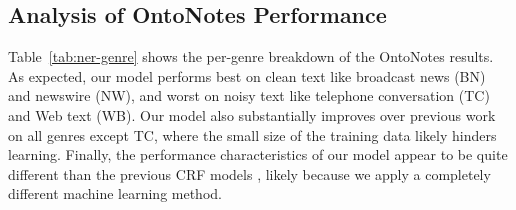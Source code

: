 \documentclass[11pt,letterpaper]{article}
\begin{document}
%

\subsection{Analysis of OntoNotes Performance}

Table~\ref{tab:ner-genre} shows the per-genre breakdown of the OntoNotes results. As expected, our model performs best on clean text like broadcast news (BN) and newswire (NW), and worst on noisy text like telephone conversation (TC) and Web text (WB). Our model also substantially improves over previous work on all genres except TC, where the small size of the training data likely hinders learning. Finally, the performance characteristics of our model appear to be quite different than the previous CRF models \cite{finkel2009,durrett2014}, likely because we apply a completely different machine learning method.
\end{document}
